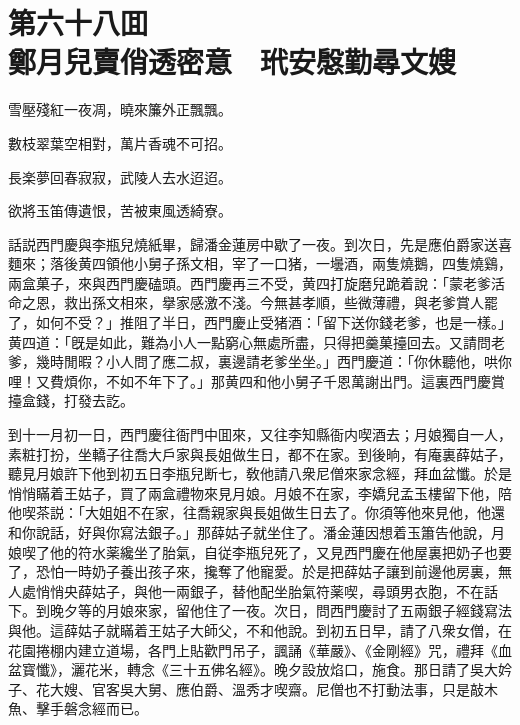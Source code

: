 
\chapter*{第六十八囬　\\鄭月兒賣俏透密意　玳安慇勤尋文嫂}


\begin{myquote}
雪壓殘紅一夜凋，曉來簾外正飄飄。

數枝翠葉空相對，萬片香魂不可招。

長楽夢回春寂寂，武陵人去水迢迢。

欲將玉笛傳遺恨，苦被東風透綺寮。
\end{myquote}

話説西門慶與李瓶兒燒紙畢，歸潘金蓮房中歇了一夜。到次日，先是應伯爵家送喜麵來；落後黄四領他小舅子孫文相，宰了一口猪，一壜酒，兩隻燒鵝，四隻燒鷄，兩盒菓子，來與西門慶磕頭。西門慶再三不受，黄四打旋磨兒跪着說：「蒙老爹活命之恩，救出孫文相來，擧家感激不淺。今無甚孝順，些微薄禮，與老爹賞人罷了，如何不受？」推阻了半日，西門慶止受猪酒：「留下送你錢老爹，也是一樣。」黄四道：「旣是如此，難為小人一點窮心無處所盡，只得把羹菓擡回去。又請問老爹，幾時閒暇？小人問了應二叔，裏邊請老爹坐坐。」西門慶道：「你休聽他，哄你哩！又費煩你，不如不年下了。」那黄四和他小舅子千恩萬謝出門。這裏西門慶賞擡盒錢，打發去訖。

到十一月初一日，西門慶往衙門中囬來，又往李知縣衙内喫酒去；月娘獨自一人，素粧打扮，坐轎子往喬大戶家與長姐做生日，都不在家。到後晌，有庵裏薛姑子，聽見月娘許下他到初五日李瓶兒断七，敎他請八衆尼僧來家念經，拜血盆懺。於是悄悄瞞着王姑子，買了兩盒禮物來見月娘。月娘不在家，李嬌兒孟玉樓留下他，陪他喫茶説：「大姐姐不在家，往喬親家與長姐做生日去了。你須等他來見他，他還和你說話，好與你寫法銀子。」那薛姑子就坐住了。潘金蓮因想着玉簫告他說，月娘喫了他的符水薬纔坐了胎氣，自従李瓶兒死了，又見西門慶在他屋裏把奶子也要了，恐怕一時奶子養出孩子來，攙奪了他寵愛。於是把薛姑子讓到前邊他房裏，無人處悄悄央薛姑子，與他一兩銀子，替他配坐胎氣符薬喫，尋頭男衣胞，不在話下。到晚夕等的月娘來家，留他住了一夜。次日，問西門慶討了五兩銀子經錢寫法與他。這薛姑子就瞞着王姑子大師父，不和他說。到初五日早，請了八衆女僧，在花園捲棚内建立道場，各門上貼歡門吊子，諷誦《華嚴》、《金剛經》咒，禮拜《血盆寳懺》，灑花米，轉念《三十五佛名經》。晚夕設放焰口，施食。那日請了吳大妗子、花大嫂、官客吳大舅、應伯爵、溫秀才喫齋。尼僧也不打動法事，只是敲木魚、擊手磐念經而已。

